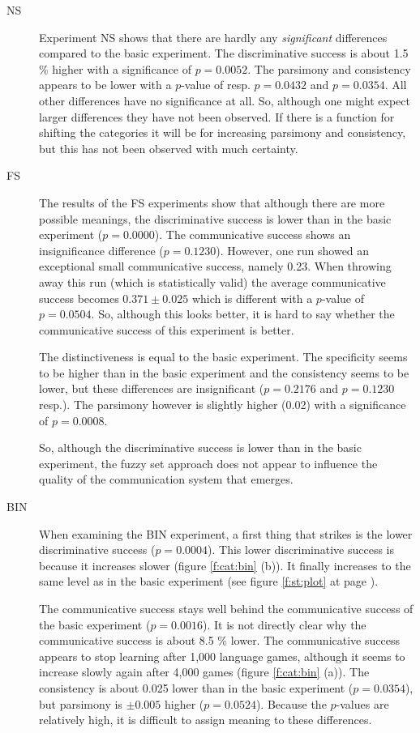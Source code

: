 \begin{description}
\item[NS] Experiment NS shows that there are hardly any {\em significant} differences compared to the basic experiment. The discriminative success is about 1.5 \% higher with a significance of $p=0.0052$. The parsimony and consistency appears to be lower with a $p$-value of resp. $p=0.0432$ and $p=0.0354$. All other differences have no significance at all. So, although one might expect larger differences they have not been observed. If there is a function for shifting the categories it will be for increasing parsimony and consistency, but this has not been observed with much certainty.

\item[FS] The results of the FS experiments show that although there are more possible meanings, the discriminative success is lower than in the basic experiment ($p=0.0000$). The communicative success shows an insignificance difference ($p=0.1230$). However,  one run showed an exceptional small communicative success, namely 0.23. When throwing away this run (which is statistically valid) the average communicative success becomes $0.371 \pm 0.025$ which is different with a $p$-value of $p=0.0504$. So, although this looks better, it is hard to say whether the communicative success of this experiment is better. 

The distinctiveness is equal to the basic experiment. The specificity seems to be higher than in the basic experiment and the consistency seems to be lower, but these differences are insignificant ($p=0.2176$ and $p=0.1230$ resp.). The parsimony however is slightly higher (0.02) with a significance of $p=0.0008$.

So, although the discriminative success is lower than in the basic experiment, the fuzzy set approach does not appear to influence the quality of the communication system that emerges. 

\item[BIN] When examining the BIN experiment, a first thing that strikes is the lower discriminative success ($p=0.0004$). This lower discriminative success is because it increases slower (figure \ref{f:cat:bin} (b)). It finally increases to the same level as in the basic experiment (see figure \ref{f:st:plot} at page \pageref{f:st:plot}).

The communicative success stays well behind the communicative success of the basic experiment ($p=0.0016$). It is not directly clear why the communicative success is about 8.5 \% lower. The communicative success appears to stop learning after 1,000 language games, although it seems to increase slowly again after 4,000 games (figure \ref{f:cat:bin} (a)). The consistency is about 0.025 lower than in the basic experiment ($p=0.0354$), but parsimony is $\pm 0.005$ higher ($p=0.0524$). Because the $p$-values are relatively high, it is difficult to assign meaning to these differences.


\end{description}
